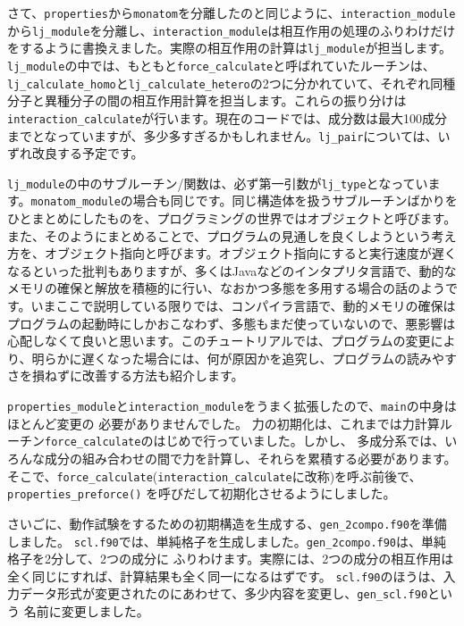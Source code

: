 \documentclass[a4,10pt]{article}
\begin{document}
さて、{\tt properties}から{\tt monatom}を分離したのと同じように、{\tt interaction\_module}から{\tt lj\_module}を分離し、{\tt interaction\_module}は相互作用の処理のふりわけだけをするように書換えました。実際の相互作用の計算は{\tt lj\_module}が担当します。{\tt lj\_module}の中では、もともと{\tt force\_calculate}と呼ばれていたルーチンは、{\tt lj\_calculate\_homo}と{\tt lj\_calculate\_hetero}の2つに分かれていて、それぞれ同種分子と異種分子の間の相互作用計算を担当します。これらの振り分けは{\tt interaction\_calculate}が行います。現在のコードでは、成分数は最大100成分までとなっていますが、多少多すぎるかもしれません。{\tt lj\_pair}については、いずれ改良する予定です。

\begin{shadebox}
    {\tt lj\_module}の中のサブルーチン/関数は、必ず第一引数が{\tt lj\_type}となっています。{\tt monatom\_module}の場合も同じです。同じ構造体を扱うサブルーチンばかりをひとまとめにしたものを、プログラミングの世界ではオブジェクトと呼びます。また、そのようにまとめることで、プログラムの見通しを良くしようという考え方を、オブジェクト指向と呼びます。オブジェクト指向にすると実行速度が遅くなるといった批判もありますが、多くはJavaなどのインタプリタ言語で、動的なメモリの確保と解放を積極的に行い、なおかつ多態を多用する場合の話のようです。いまここで説明している限りでは、コンパイラ言語で、動的メモリの確保はプログラムの起動時にしかおこなわず、多態もまだ使っていないので、悪影響は心配しなくて良いと思います。このチュートリアルでは、プログラムの変更により、明らかに遅くなった場合には、何が原因かを追究し、プログラムの読みやすさを損ねずに改善する方法も紹介します。
\end{shadebox}

{\tt properties\_module}と{\tt interaction\_module}をうまく拡張したので、{\tt main}の中身はほとんど変更の
必要がありませんでした。
力の初期化は、これまでは力計算ルーチン{\tt force\_calculate}のはじめで行っていました。しかし、
多成分系では、いろんな成分の組み合わせの間で力を計算し、それらを累積する必要があります。
そこで、{\tt force\_calculate}({\tt interaction\_calculate}に改称)を呼ぶ前後で、{\tt properties\_preforce()}
を呼びだして初期化させるようにしました。

さいごに、動作試験をするための初期構造を生成する、{\tt gen\_2compo.f90}を準備しました。
{\tt scl.f90}では、単純格子を生成しました。{\tt gen\_2compo.f90}は、単純格子を2分して、2つの成分に
ふりわけます。実際には、2つの成分の相互作用は全く同じにすれば、計算結果も全く同一になるはずです。
{\tt scl.f90}のほうは、入力データ形式が変更されたのにあわせて、多少内容を変更し、{\tt gen\_scl.f90}という
名前に変更しました。
\end{document}
